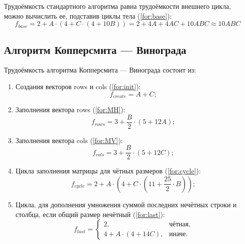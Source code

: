\documentclass[12pt]{report}
\begin{document}
Трудоёмкость стандартного алгоритма равна трудоёмкости внешнего цикла, можно вычислить ее, подставив циклы тела (\ref{for:base}):
\begin{equation}
	\label{for:base}
	f_{base} = 2 + A \cdot (4 + C \cdot (4 + 10B)) = 2 + 4A + 4AC + 10ABC \approx 10ABC
\end{equation}

\subsection{Алгоритм Копперсмита — Винограда}

Трудоёмкость алгоритма Копперсмита — Винограда состоит из:

\begin{enumerate}
	\item Создания векторов rows и cols (\ref{for:init}):
	\begin{equation}
	\label{for:init}
	f_{create} = A + C;
	\end{equation}
	
	\item Заполнения вектора rows (\ref{for:MH}):
	\begin{equation}
	\label{for:MH}
	f_{rows} = 3 + \frac{B}{2} \cdot (5 + 12A);
	\end{equation}
	
	\item Заполнения вектора cols (\ref{for:MV}):
	\begin{equation}
	\label{for:MV}
	f_{cols} = 3 + \frac{B}{2} \cdot (5 + 12C);
	\end{equation}
	
	\item Цикла заполнения матрицы для чётных размеров (\ref{for:cycle}):
	\begin{equation}
	\label{for:cycle}
	f_{cycle} = 2 + A \cdot (4 + C \cdot (11 + \frac{25}{2} \cdot B));
	\end{equation}
	
	\item Цикла, для дополнения умножения суммой последних нечётных строки и столбца, если общий размер нечётный (\ref{for:last}):
	\begin{equation}
	\label{for:last}
	f_{last} = \begin{cases}
	2, & \text{чётная,}\\
	4 + A \cdot (4 + 14C), & \text{иначе.}
	\end{cases}
	\end{equation}
\end{enumerate}
\end{document}
